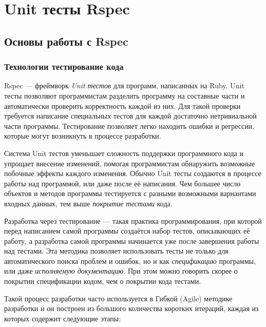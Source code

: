\chapter{Unit тесты Rspec}

\section{Основы работы с Rspec}

\subsection{Технологии тестирование кода}

Rspec --- фреймворк \emph{Unit тестов} для программ, написанных на Ruby. Unit тесты позволяют программистам разделить программу на составные части и автоматически проверить корректность каждой из них. Для такой проверки требуется написание специальных тестов для каждой достаточно нетривиальной части программы. Тестирование позволяет легко находить ошибки и регрессии, которые могут возникнуть в процессе разработки.

Система Unit тестов уменьшает сложность поддержки программного кода и упрощает внесение изменений, помогая программистам обнаружить возможные побочные эффекты каждого изменения. Обычно Unit тесты создаются в процессе работы над программой, или даже после её написания. Чем большее число объектов и методов программы тестируется с разными возможными вариантами входных данных, тем выше \emph{покрытие тестами} кода.

Разработка через тестирование --- такая практика программирования, при которой перед написанием самой программы создаётся набор тестов, описывающих её работу, а разработка самой программы начинается уже после завершения работы над тестами. Эта методика позволяет использовать тесты не только для автоматического поиска проблем и ошибок, но и как \emph{спецификацию} программы, или даже \emph{исполняемую документацию}. При этом можно говорить скорее о покрытии спецификации кодом, чем о покрытии кода тестами.

Такой процесс разработки часто используется в Гибкой (Agile) методике разработки и он построен из большого количества коротких итераций, каждая из которых содержит следующие этапы:

